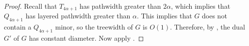 \documentclass{patmorin}
\begin{document}
\begin{proof}
  Recall that $T_{4\alpha+1}$ has pathwidth greater than $2\alpha$,
  which implies that $Q_{4\alpha+1}$ has layered pathwidth greater than
  $\alpha$.  This implies that $G$ does not contain a $Q_{4\alpha+1}$
  minor, so the treewidth of $G$ is $O(1)$.  Therefore, by
  , the dual $G'$ of $G$ has constant diameter.
  Now apply .
\end{proof}



\end{document}
